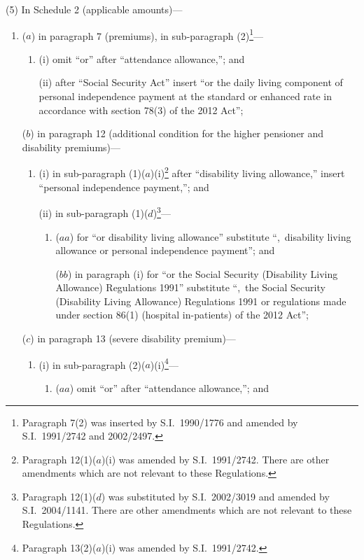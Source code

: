 \documentclass[12pt,a4paper]{article}
\begin{document}
(5) In Schedule 2 (applicable amounts)—
\begin{enumerate}\item[]
($a$) in paragraph 7 (premiums), in sub-paragraph (2)\footnote{Paragraph 7(2) was inserted by S.I.~1990/1776 and amended by S.I.~1991/2742 and 2002/2497.}—
\begin{enumerate}\item[]
(i) omit “or” after “attendance allowance,”; and

(ii) after “Social Security Act” insert “or the daily living component of personal independence payment at the standard or enhanced rate in accordance with section 78(3) of the 2012 Act”;
\end{enumerate}

($b$) in paragraph 12 (additional condition for the higher pensioner and disability premiums)—
\begin{enumerate}\item[]
(i) in sub-paragraph (1)($a$)(i)\footnote{Paragraph 12(1)($a$)(i)  was amended by S.I.~1991/2742. There are other amendments which are not relevant to these Regulations.} after “disability living allowance,” insert “personal independence payment,”; and

(ii) in sub-paragraph (1)($d$)\footnote{Paragraph 12(1)($d$)  was substituted by S.I.~2002/3019 and amended by S.I.~2004/1141. There are other amendments which are not relevant to these Regulations.}—
\begin{enumerate}\item[]
($aa$) for “or disability living allowance” substitute “,~disability living allowance or personal independence payment”; and

($bb$) in paragraph (i)  for “or the Social Security (Disability Living Allowance) Regulations 1991” substitute “,~the Social Security (Disability Living Allowance) Regulations 1991 or regulations made under section 86(1) (hospital in-patients) of the 2012 Act”;
\end{enumerate}
\end{enumerate}

($c$) in paragraph 13 (severe disability premium)—
\begin{enumerate}\item[]
(i) in sub-paragraph (2)($a$)(i)\footnote{Paragraph 13(2)($a$)(i)  was amended by S.I.~1991/2742.}—
\begin{enumerate}\item[]
($aa$) omit “or” after “attendance allowance,”; and


\end{enumerate}
\end{enumerate}
\end{enumerate}
\end{document}
